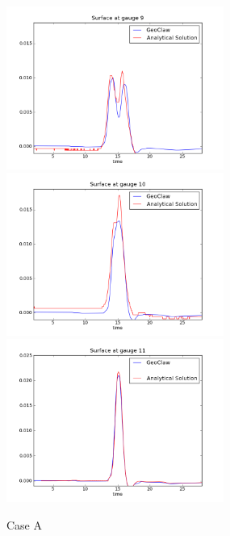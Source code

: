 \begin{figure}[ht]
\hfil\includegraphics[width=2.8in]{bp2/CaseA/gauge0009fig300.png}\hfil
\vskip 5pt
\hfil\includegraphics[width=2.8in]{bp2/CaseA/gauge0010fig300.png}\hfil
\hfil\includegraphics[width=2.8in]{bp2/CaseA/gauge0011fig300.png}\hfil
\caption{\label{fig:bp2A} Case A }
\end{figure}

